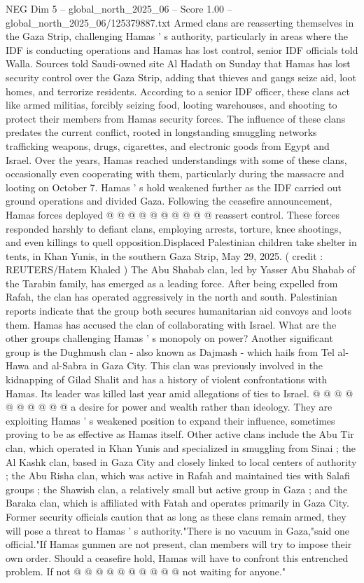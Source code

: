 \begin{textsample}{NEG Dim 5 – global\_north\_2025\_06 – Score 1.00 – global\_north\_2025\_06/125379887.txt}  \label{ex:f5_neg_388}
Armed clans are reasserting themselves in the Gaza Strip, challenging Hamas ' s authority, particularly in areas where the IDF is conducting operations and Hamas has lost control, senior IDF officials told Walla.
Sources told Saudi-owned site Al Hadath on Sunday that Hamas has lost security control over the Gaza Strip, adding that thieves and gangs seize aid, loot homes, and terrorize residents.
According to a senior IDF officer, these clans act like armed militias, forcibly seizing food, looting warehouses, and shooting to protect their members from Hamas security forces.
The influence of these clans predates the current conflict, rooted in longstanding smuggling networks trafficking weapons, drugs, cigarettes, and electronic goods from Egypt and Israel.
Over the years, Hamas reached understandings with some of these clans, occasionally even cooperating with them, particularly during the massacre and looting on October 7.
Hamas ' s hold weakened further as the IDF carried out ground operations and divided Gaza.
Following the ceasefire announcement, Hamas forces deployed @ @ @ @ @ @ @ @ @ @ reassert control.
These forces responded harshly to defiant clans, employing arrests, torture, knee shootings, and even killings to quell opposition.Displaced Palestinian children take shelter in tents, in Khan Yunis, in the southern Gaza Strip, May 29, 2025. ( credit : REUTERS/Hatem Khaled ) The Abu Shabab clan, led by Yasser Abu Shabab of the Tarabin family, has emerged as a leading force.
After being expelled from Rafah, the clan has operated aggressively in the north and south.
Palestinian reports indicate that the group both secures humanitarian aid convoys and loots them.
Hamas has accused the clan of collaborating with Israel.
What are the other groups challenging Hamas ' s monopoly on power?
Another significant group is the Dughmush clan - also known as Dajmash - which hails from Tel al-Hawa and al-Sabra in Gaza City.
This clan was previously involved in the kidnapping of Gilad Shalit and has a history of violent confrontations with Hamas.
Its leader was killed last year amid allegations of ties to Israel. @ @ @ @ @ @ @ @ @ @ a desire for power and wealth rather than ideology.
They are exploiting Hamas ' s weakened position to expand their influence, sometimes proving to be as effective as Hamas itself.
Other active clans include the Abu Tir clan, which operated in Khan Yunis and specialized in smuggling from Sinai ; the Al Kashk clan, based in Gaza City and closely linked to local centers of authority ; the Abu Risha clan, which was active in Rafah and maintained ties with Salafi groups ; the Shawish clan, a relatively small but active group in Gaza ; and the Baraka clan, which is affiliated with Fatah and operates primarily in Gaza City.
Former security officials caution that as long as these clans remain armed, they will pose a threat to Hamas ' s authority."There is no vacuum in Gaza,"said one official."If Hamas gunmen are not present, clan members will try to impose their own order.
Should a ceasefire hold, Hamas will have to confront this entrenched problem.
If not @ @ @ @ @ @ @ @ @ @ not waiting for anyone."

\end{textsample}
